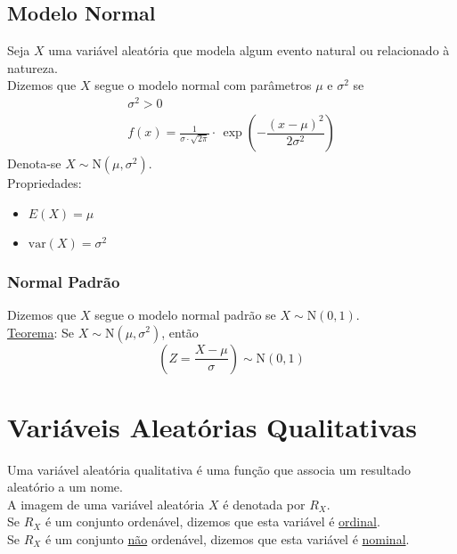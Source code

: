 \documentclass{article}
\begin{document}
\subsection{Modelo Normal}
Seja $X$ uma variável aleatória que modela algum evento natural ou relacionado à natureza. \\
Dizemos que $X$ segue o modelo normal com parâmetros $\mu$ e $\sigma^2$ se
\begin{gather*}
  \sigma^2 > 0 \\[5pt]
  f(x) = \frac{1}{\sigma \cdot \sqrt{2\pi}} \cdot\, \exp \left( -\dfrac{{(x - \mu)}^2}{2 \sigma^2} \right)
\end{gather*}
Denota-se $X \sim \text{N}\left(\mu, \sigma^2\right)$. \\[10pt]
Propriedades:
\begin{itemize}
  \item $E(X) = \mu$
  \item $\text{var}(X) = \sigma^2$
\end{itemize}

\subsubsection{Normal Padrão}
Dizemos que $X$ segue o modelo normal padrão se $X \sim \text{N}\left(0, 1\right)$. \\[10pt]
\uline{Teorema}: Se $X \sim \text{N}\left(\mu, \sigma^2\right)$, então
\[ \left( Z = \frac{X - \mu}{\sigma} \right) \sim \text{N}\left(0, 1\right) \]


\section{Variáveis Aleatórias Qualitativas}
Uma variável aleatória qualitativa é uma função que associa um resultado aleatório a um nome. \\[5pt]
A imagem de uma variável aleatória $X$ é denotada por $R_X$. \\[5pt]
Se $R_X$ é um conjunto ordenável, dizemos que esta variável é \uline{ordinal}. \\
Se $R_X$ é um conjunto \uline{não} ordenável, dizemos que esta variável é \uline{nominal}. \\
\end{document}
